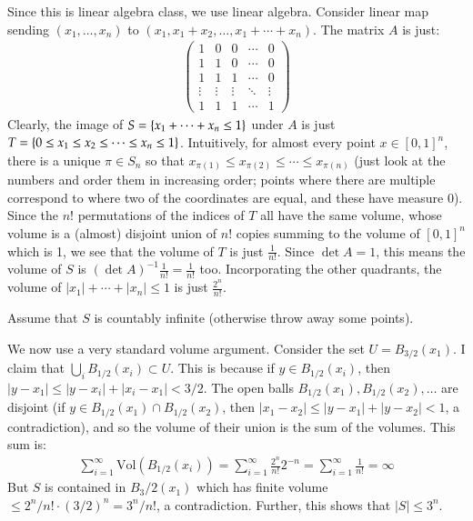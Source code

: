 \documentclass[12pt]{article}
\newcommand{\SET}[1]{\Set{\mskip-\medmuskip #1 \mskip-\medmuskip}}
\newcommand{\1}{\mathds 1}
\newcommand{\Vol}{\mathrm{Vol}}
\begin{document}
\begin{enumerate}
        Since this is linear algebra class, we use linear algebra. Consider linear map sending $(x_1, \ldots, x_n)$ to $(x_1, x_1+x_2, \ldots, x_1+\cdots+x_n)$. The matrix $A$ is just:
        \begin{align*}
            \begin{pmatrix}
                1 & 0 & 0 & \cdots & 0 \\
                1 & 1 & 0 & \cdots & 0 \\
                1 & 1 & 1 & \cdots & 0 \\
                \vdots & \vdots & \vdots & \ddots & \vdots \\
                1 & 1 & 1 & \cdots & 1
            \end{pmatrix}
        \end{align*}
        Clearly, the image of $S = \SET{x_1+\cdots + x_n \leq 1}$ under $A$ is just $T = \SET{0 \leq x_1 \leq x_2 \leq \cdots \leq x_n \leq 1}$. Intuitively, for almost every point $x \in [0,1]^n$, there is a unique $\pi \in S_n$ so that $x_{\pi(1)} \leq x_{\pi(2)} \leq \cdots \leq x_{\pi(n)}$ (just look at the numbers and order them in increasing order; points where there are multiple correspond to where two of the coordinates are equal, and these have measure 0). Since the $n!$ permutations of the indices of $T$ all have the same volume, whose volume is a (almost) disjoint union of $n!$ copies summing to the volume of $[0,1]^n$ which is 1, we see that the volume of $T$ is just $\frac{1}{n!}$. Since $\det A = 1$, this means the volume of $S$ is $(\det A)^{-1} \frac{1}{n!} = \frac{1}{n!}$ too. Incorporating the other quadrants, the volume of $|x_1| + \cdots + |x_n| \leq 1$ is just $\frac{2^n}{n!}$. 

        Assume that $S$ is countably infinite (otherwise throw away some points).
        
        We now use a very standard volume argument. Consider the set $U = B_{3/2}(x_1)$. I claim that $\bigcup_i B_{1/2}(x_i) \subset U$. This is because if $y \in B_{1/2}(x_i)$, then $|y-x_1| \leq |y-x_i| + |x_i-x_1| < 3/2$. The open balls $B_{1/2}(x_1), B_{1/2}(x_2), \ldots$ are disjoint (if $y \in B_{1/2}(x_1) \cap B_{1/2}(x_2)$, then $|x_1-x_2| \leq |y-x_1| + |y-x_2| < 1$, a contradiction), and so the volume of their union is the sum of the volumes. This sum is:
        \begin{align*}
            \sum_{i=1}^\infty \Vol(B_{1/2}(x_i)) = \sum_{i=1}^\infty \frac{2^n}{n!} 2^{-n} = \sum_{i=1}^\infty \frac{1}{n!} = \infty
        \end{align*}
        But $S$ is contained in $B_3/2(x_1)$ which has finite volume $\leq 2^n/n! \cdot (3/2)^n = 3^n/n!$, a contradiction. Further, this shows that $|S| \leq 3^n$.
    \end{enumerate}
\end{document}
